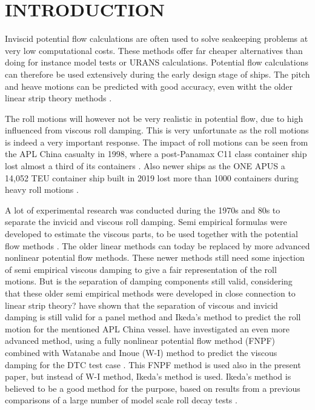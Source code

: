 \section*{INTRODUCTION}\label{introduction}

Inviscid potential flow calculations are often used to solve seakeeping
problems at very low computational costs. These methods offer far
cheaper alternatives than doing for instance model tests or URANS
calculations. Potential flow calculations can therefore be used
extensively during the early design stage of ships. The pitch and heave
motions can be predicted with good accuracy, even witht the older linear
strip theory methods \citep{7505983/FB64RGPF}.

The roll motions will however not be very realistic in potential flow,
due to high influenced from viscous roll damping. This is very
unfortunate as the roll motions is indeed a very important response. The
impact of roll motions can be seen from the APL China casualty in 1998,
where a post-Panamax C11 class container ship lost almost a third of its
containers \citep{7505983/WPADAQB3}. Also newer ships as the ONE APUS a
14,052 TEU container ship built in 2019 lost more than 1000 containers
during heavy roll motions \citep{7505983/EYV6YF92}.

A lot of experimental research was conducted during the 1970s and 80s to
separate the invicid and viscous roll damping. Semi empirical formulas
were developed to estimate the viscous parts, to be used together with
the potential flow methods \citep{7505983/937PN5DT}. The older linear
methods can today be replaced by more advanced nonlinear potential flow
methods. These newer methods still need some injection of semi empirical
viscous damping to give a fair representation of the roll motions. But
is the separation of damping components still valid, considering that
these older semi empirical methods were developed in close connection to
linear strip theory? \citep{7505983/UGK6YEVD} have shown that the
separation of viscous and invicid damping is still valid for a panel
method and Ikeda's method to predict the roll motion for the mentioned
APL China vessel. \citep{7505983/24TNAV5Z} have investigated an even more
advanced method, using a fully nonlinear potential flow method (FNPF)
\citep{7505983/P4XDUMMQ} combined with Watanabe and Inoue (W-I) method
\citep{7505983/ARMIRMVY} to predict the viscous damping for the DTC test
case \citep{7505983/BYNJ8CFG}. This FNPF method is used also in the
present paper, but instead of W-I method, Ikeda's method is used.
Ikeda's method is believed to be a good method for the purpose, based on
results from a previous comparisons of a large number of model scale
roll decay tests \citep{7505983/QMGQ76Q9}.

